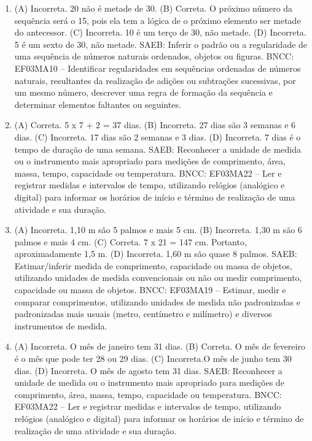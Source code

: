 \begin{enumerate}
\item
(A) Incorreta. 20 não é metade de 30.
(B) Correta. O próximo número da sequência será o 15, pois ela tem a lógica de o próximo
elemento ser metade do antecessor.
(C) Incorreta. 10 é um terço de 30, não metade.
(D) Incorreta. 5 é um sexto de 30, não metade.
SAEB: Inferir o padrão ou a regularidade de uma sequência de números naturais ordenados, objetos ou figuras.
BNCC: EF03MA10 -- Identificar regularidades em sequências ordenadas de números naturais,
resultantes da realização de adições ou subtrações sucessivas, por um mesmo número,
descrever uma regra de formação da sequência e determinar elementos faltantes ou seguintes.

\item
(A) Correta. 5 x 7 + 2 = 37 dias.
(B) Incorreta. 27 dias são 3 semanas e 6 dias.
(C) Incorreta. 17 dias são 2 semanas e 3 dias.
(D) Incorreta. 7 dias é o tempo de duração de uma semana.
SAEB: Reconhecer a unidade de medida ou o instrumento mais apropriado para medições de comprimento, área, massa, tempo, capacidade
ou temperatura.
BNCC: EF03MA22 -- Ler e registrar medidas e intervalos de tempo, utilizando relógios (analógico e
digital) para informar os horários de início e término de realização de uma atividade e sua
duração.

\item
(A) Incorreta. 1,10 m são 5 palmos e mais 5 cm.
(B) Incorreta. 1,30 m são 6 palmos e mais 4 cm. 
(C) Correta. 7 x 21 = 147 cm. Portanto, aproximadamente 1,5 m.
(D) Incorreta. 1,60 m são quase 8 palmos.
SAEB: Estimar/inferir medida de comprimento, capacidade ou massa de objetos, utilizando unidades de medida convencionais ou não ou medir comprimento, capacidade ou massa de objetos.
BNCC: EF03MA19 -- Estimar, medir e comparar comprimentos, utilizando unidades de medida
não padronizadas e padronizadas mais usuais (metro, centímetro e milímetro) e diversos
instrumentos de medida.

\item
(A) Incorreta. O mês de janeiro tem 31 dias.
(B) Correta. O mês de fevereiro é o mês que pode ter 28 ou 29 dias.
(C) Incorreta.O mês de junho tem 30 dias.
(D) Incorreta. O mês de agosto tem 31 dias.
SAEB: Reconhecer a unidade de medida ou o instrumento mais apropriado para medições de comprimento, área, massa, tempo, capacidade ou temperatura.
BNCC: EF03MA22 -- Ler e registrar medidas e intervalos de tempo, utilizando relógios (analógico e
digital) para informar os horários de início e término de realização de uma atividade e sua
duração.


\end{enumerate}
